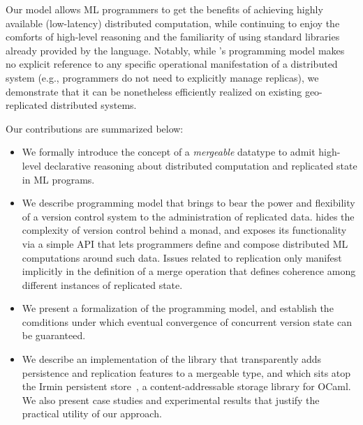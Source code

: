 Our model allows ML programmers to get the benefits of achieving
highly available (low-latency) distributed computation, while
continuing to enjoy the comforts of high-level reasoning and the
familiarity of using standard libraries already provided by the
language.  Notably, while \name's programming model makes no explicit
reference to any specific operational manifestation of a distributed
system (e.g., programmers do not need to explicitly manage replicas),
we demonstrate that it can be nonetheless efficiently realized on
existing geo-replicated distributed systems.

Our contributions are summarized below:

\begin{itemize}
    \item We formally introduce the concept of a \emph{mergeable}
      datatype to admit high-level declarative reasoning about
      distributed computation and replicated state in ML programs.

    \item We describe \name programming model that brings to bear the
      power and flexibility of a version control system to the
      administration of replicated data. \name hides the complexity of
      version control behind a monad, and exposes its functionality
      via a simple API that lets programmers define and compose
      distributed ML computations around such data.  Issues related to
      replication only manifest implicitly in the definition of a
      merge operation that defines coherence among different instances
      of replicated state.

    \item We present a formalization of the \name programming model,
      and establish the comditions under which eventual convergence of
      concurrent version state can be guaranteed.

    \item We describe an implementation of the \name library that
      transparently adds persistence and replication features to a
      mergeable type, and which sits atop the Irmin persistent
      store~\cite{irmin}, a content-addressable storage library for
      OCaml. We also present case studies and experimental results
      that justify the practical utility of our approach.
\end{itemize}

